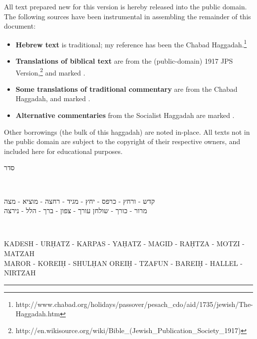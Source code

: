 \documentclass[a4paper,10pt,openany]{memoir}
\newcommand{\hchapter}[1]{
  \begin{hebrew}
    \begin{Spacing}{.97}
      \newpage
      \strut

      \vspace{.15em}

      \noindent\Huge #1

      \vspace{1em}
    \end{Spacing}
  \end{hebrew}
}
\newcommand{\HgFill}{\vfill \hrule \vfill}
\newenvironment{HgTranslit}{\strut\\\noindent\begin{itshape}}{\end{itshape}\vspace{1em}}
\newenvironment{HgHebrew}{\begin{hebrew}\strut\\\noindent\Large}{\end{hebrew}}
\newcommand{\CSrc}{}
\newcommand{\JSrc}{\textsuperscript{\upshape{[J]}}}
\newcommand{\LSrc}{\textsuperscript{\upshape{[L]}}}
\newcommand{\SSrc}{\textsuperscript{\upshape{[S]}}}
\begin{document}
All text prepared new for this version is 
hereby released
into the public domain. The following sources have been instrumental in
assembling the remainder of this document:
\begin{itemize}
  \item {\bfseries Hebrew text} is traditional; my reference has been the Chabad
    Haggadah.\footnote{http://www.chabad.org/holidays/passover/pesach\_cdo/aid/1735/jewish/The-Haggadah.htm}
  \item {\bfseries Translations of biblical text} are from the (public-domain)
    1917 JPS
    Version,\footnote{http://en.wikisource.org/wiki/Bible\_(Jewish\_Publication\_Society\_1917)}
    and marked \JSrc.
  \item {\bfseries Some translations of traditional commentary} are from the
    Chabad Haggadah, and marked \LSrc.
  \item {\bfseries Alternative commentaries} from the Socialist Haggadah
    are marked \SSrc.
\end{itemize}
Other borrowings (the bulk of this haggadah) are noted in-place. All texts not
in the public domain are subject to the copyright of their respective owners,
and included here for educational purposes.

\hchapter{סדר}

\vspace{-2em}
\begin{HgHebrew}
  \begin{center}
  קדש 
  -
  ורחץ
  -
  כרפס 
  -
  יחץ 
  -
  מגיד 
  -
  רחצה 
  -
  מוציא
  -
  מצה 
  \\
  מרור 
  -
  כורך 
  -
  שולחן עורך 
  -
  צפון
  -
  ברך 
  -
  הלל 
  -
  נירצה 
  \end{center}
\end{HgHebrew}
\vspace{-3em}
\begin{HgTranslit}
  \begin{center}
  {\small 
    KADESH - UR\d{H}ATZ - KARPAS - YA\d{H}ATZ - %
    MAGID - RA\d{H}TZA - MOTZI - MATZAH \\ 
    MAROR - KOREI\d{H} - SHUL\d{H}AN OREI\d{H} - %
    TZAFUN - BAREI\d{H} - HALLEL - NIRTZAH}
  \end{center}
\end{HgTranslit}

\HgFill
\strut
\end{document}
